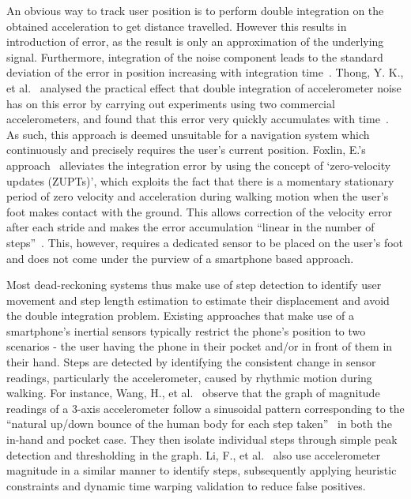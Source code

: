 \documentclass[12pt,a4paper]{report}
\begin{document}
An obvious way to track user position is to perform double integration on the obtained acceleration to get distance travelled. However this results in introduction of error, as the result is only an approximation of the underlying signal. Furthermore, integration of the noise component leads to the standard deviation of the error in position increasing with integration time~\cite[p.73]{integrationError}. Thong, Y. K., et al.~\cite{integrationErrorPractical} analysed the practical effect that double integration of accelerometer noise has on this error by carrying out experiments using two commercial accelerometers, and found that this error very quickly accumulates with time~\cite[p.1168]{integrationErrorPractical}. As such, this approach is deemed unsuitable for a navigation system which continuously and precisely requires the user’s current position. Foxlin, E.'s approach~\cite{foxlin2005pedestrian} alleviates the integration error by using the concept of `zero-velocity updates (ZUPTs)’, which exploits the fact that there is a momentary stationary period of zero velocity and acceleration during walking motion when the user’s foot makes contact with the ground. This allows correction of the velocity error after each stride and makes the error accumulation ``linear in the number of steps''~\cite[p.38]{foxlin2005pedestrian}. This, however, requires a dedicated sensor to be placed on the user’s foot and does not come under the purview of a smartphone based approach. 

Most dead-reckoning systems thus make use of step detection to identify user movement and step length estimation to estimate their displacement and avoid the double integration problem. Existing approaches that make use of a smartphone’s inertial sensors typically restrict the phone’s position to two scenarios - the user having the phone in their pocket and/or in front of them in their hand. Steps are detected by identifying the consistent change in sensor readings, particularly the accelerometer, caused by rhythmic motion during walking. For instance, Wang, H., et al.~\cite{wang2012no} observe that the graph of magnitude readings of a 3-axis accelerometer follow a sinusoidal pattern corresponding to the ``natural up/down bounce of the human body for each step taken''~\cite[p.203]{wang2012no} in both the in-hand and pocket case. They then isolate individual steps through simple peak detection and thresholding in the graph. Li, F., et al.~\cite{li2012reliable} also use accelerometer magnitude in a similar manner to identify steps, subsequently applying heuristic constraints and dynamic time warping validation to reduce false positives.  
\end{document}
